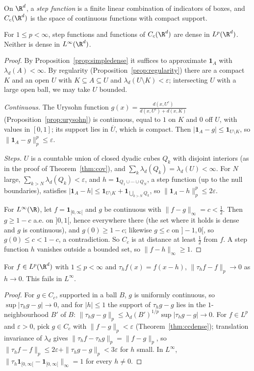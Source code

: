On $\R^d$, a \emph{step function} is a finite linear combination of indicators of boxes, and $C_c(\R^d)$ is the space of continuous functions with compact support.

\begin{theorem}\label{thm:ccdense}
For $1\le p<\infty$, step functions and functions of $C_c(\R^d)$ are dense in $L^p(\R^d)$. Neither is dense in $L^\infty(\R^d)$.
\end{theorem}
\begin{proof}
By Proposition~\ref{prop:simpledense} it suffices to approximate $\mathbf 1_A$ with $\lambda_d(A)<\infty$. By regularity (Proposition~\ref{prop:regularity}) there are a compact $K$ and an open $U$ with $K\subseteq A\subseteq U$
and $\lambda_d(U\setminus K)<\varepsilon$; intersecting $U$ with a large open ball, we may take $U$ bounded.

\emph{Continuous.} The Urysohn function $g(x)=\frac{d(x,U^c)}{d(x,U^c)+d(x,K)}$ (Proposition~\ref{prop:urysohn}) is continuous, equal to $1$ on $K$ and $0$ off $U$, with values in $[0,1]$; its support lies in $\overline U$, which is compact.
Then $|\mathbf 1_A-g|\le\mathbf 1_{U\setminus K}$, so $\|\mathbf 1_A-g\|_p^p\le\varepsilon$.

\emph{Steps.} $U$ is a countable union of closed dyadic cubes $Q_k$ with disjoint interiors (as in the proof of Theorem~\ref{thm:cov}), and $\sum_k\lambda_d(Q_k)=\lambda_d(U)<\infty$. For $N$ large,
$\sum_{k>N}\lambda_d(Q_k)<\varepsilon$, and $h=\mathbf 1_{Q_1\cup\cdots\cup Q_N}$, a step function (up to the null boundaries), satisfies $|\mathbf 1_A-h|\le\mathbf 1_{U\setminus K}+\mathbf 1_{\bigcup_{k>N}Q_k}$, so
$\|\mathbf 1_A-h\|_p^p\le2\varepsilon$.

For $L^\infty(\R)$, let $f=\mathbf 1_{[0,\infty[}$ and $g$ be continuous with $\|f-g\|_\infty=c<\frac12$. Then $g\ge1-c$ a.e. on $]0,1[$, hence everywhere there (the set where it holds is dense and $g$ is
continuous), and $g(0)\ge1-c$; likewise $g\le c$ on $]-1,0[$, so $g(0)\le c<1-c$, a contradiction. So $C_c$ is at distance at least $\frac12$ from $f$. A step function $h$ vanishes outside a bounded set,
so $\|f-h\|_\infty\ge1$.
\end{proof}

\begin{proposition}\label{prop:translation}
For $f\in L^p(\R^d)$ with $1\le p<\infty$ and $\tau_hf(x)=f(x-h)$, $\|\tau_hf-f\|_p\to0$ as $h\to0$. This fails in $L^\infty$.
\end{proposition}
\begin{proof}
For $g\in C_c$, supported in a ball $B$, $g$ is uniformly continuous, so $\sup|\tau_hg-g|\to0$, and for $|h|\le1$ the support of $\tau_hg-g$ lies in the $1$-neighbourhood $B'$ of $B$: $\|\tau_hg-g\|_p\le\lambda_d(B')^{1/p}\sup|\tau_hg-g|\to0$.
For $f\in L^p$ and $\varepsilon>0$, pick $g\in C_c$ with $\|f-g\|_p<\varepsilon$ (Theorem~\ref{thm:ccdense}); translation invariance of $\lambda_d$ gives $\|\tau_hf-\tau_hg\|_p=\|f-g\|_p$, so
$\|\tau_hf-f\|_p\le2\varepsilon+\|\tau_hg-g\|_p<3\varepsilon$ for $h$ small. In $L^\infty$, $\|\tau_h\mathbf 1_{[0,\infty[}-\mathbf 1_{[0,\infty[}\|_\infty=1$ for every $h\ne0$.
\end{proof}

